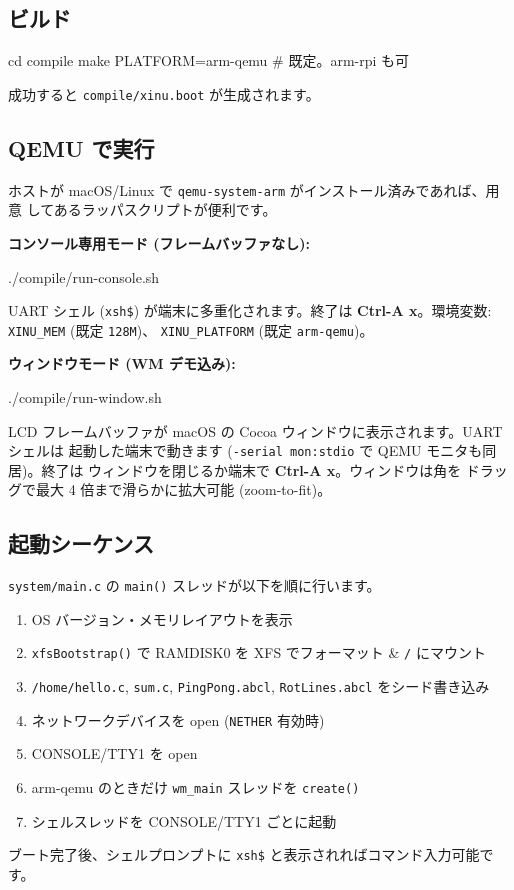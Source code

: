 \documentclass[a4paper,11pt]{ltjsarticle}
\begin{document}
\subsection{ビルド}
\begin{code}
cd compile
make PLATFORM=arm-qemu        # 既定。arm-rpi も可
\end{code}
成功すると \verb|compile/xinu.boot| が生成されます。

\subsection{QEMU で実行}
ホストが macOS/Linux で \verb|qemu-system-arm| がインストール済みであれば、用意
してあるラッパスクリプトが便利です。

\textbf{コンソール専用モード (フレームバッファなし):}
\begin{code}
./compile/run-console.sh
\end{code}
UART シェル (\verb|xsh$|) が端末に多重化されます。終了は \textbf{Ctrl-A
\textrightarrow{} x}。環境変数: \verb|XINU_MEM| (既定 \verb|128M|)、
\verb|XINU_PLATFORM| (既定 \verb|arm-qemu|)。

\textbf{ウィンドウモード (WM デモ込み):}
\begin{code}
./compile/run-window.sh
\end{code}
LCD フレームバッファが macOS の Cocoa ウィンドウに表示されます。UART シェルは
起動した端末で動きます (\verb|-serial mon:stdio| で QEMU モニタも同居)。終了は
ウィンドウを閉じるか端末で \textbf{Ctrl-A \textrightarrow{} x}。ウィンドウは角を
ドラッグで最大 4 倍まで滑らかに拡大可能 (zoom-to-fit)。

\subsection{起動シーケンス}
\verb|system/main.c| の \verb|main()| スレッドが以下を順に行います。
\begin{enumerate}[leftmargin=1.6em,itemsep=1pt]
\item OS バージョン・メモリレイアウトを表示
\item \verb|xfsBootstrap()| で RAMDISK0 を XFS でフォーマット \& \verb|/| にマウント
\item \verb|/home/hello.c|, \verb|sum.c|, \verb|PingPong.abcl|,
  \verb|RotLines.abcl| をシード書き込み
\item ネットワークデバイスを open (\verb|NETHER| 有効時)
\item CONSOLE/TTY1 を open
\item arm-qemu のときだけ \verb|wm_main| スレッドを \verb|create()|
\item シェルスレッドを CONSOLE/TTY1 ごとに起動
\end{enumerate}
ブート完了後、シェルプロンプトに \verb|xsh$| と表示されればコマンド入力可能です。
\end{document}
